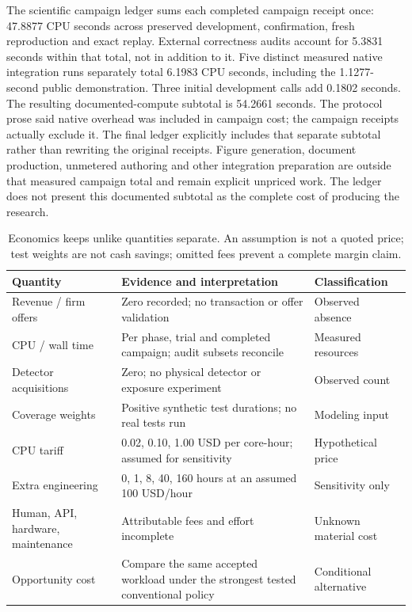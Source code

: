 The scientific campaign ledger sums each completed campaign receipt once: 47.8877 CPU seconds across preserved development, confirmation, fresh reproduction and exact replay. External correctness audits account for 5.3831 seconds within that total, not in addition to it. Five distinct measured native integration runs separately total 6.1983 CPU seconds, including the 1.1277-second public demonstration. Three initial development calls add 0.1802 seconds. The resulting documented-compute subtotal is 54.2661 seconds. The protocol prose said native overhead was included in campaign cost; the campaign receipts actually exclude it. The final ledger explicitly includes that separate subtotal rather than rewriting the original receipts. Figure generation, document production, unmetered authoring and other integration preparation are outside that measured campaign total and remain explicit unpriced work. The ledger does not present this documented subtotal as the complete cost of producing the research.

\begin{table}[htbp]
\centering\small
\begin{tabularx}{\textwidth}{@{}p{1.8in}Yp{1.25in}@{}}
\toprule
Quantity & Evidence and interpretation & Classification \\
\midrule
Revenue / firm offers & Zero recorded; no transaction or offer validation & Observed absence \\
CPU / wall time & Per phase, trial and completed campaign; audit subsets reconcile & Measured resources \\
Detector acquisitions & Zero; no physical detector or exposure experiment & Observed count \\
Coverage weights & Positive synthetic test durations; no real tests run & Modeling input \\
CPU tariff & 0.02, 0.10, 1.00 USD per core-hour; assumed for sensitivity & Hypothetical price \\
Extra engineering & 0, 1, 8, 40, 160 hours at an assumed 100 USD/hour & Sensitivity only \\
Human, API, hardware, maintenance & Attributable fees and effort incomplete & Unknown material cost \\
Opportunity cost & Compare the same accepted workload under the strongest tested conventional policy & Conditional alternative \\
\bottomrule
\end{tabularx}
\caption{Economics keeps unlike quantities separate. An assumption is not a quoted price; test weights are not cash savings; omitted fees prevent a complete margin claim.}
\label{tab:economics}
\end{table}

